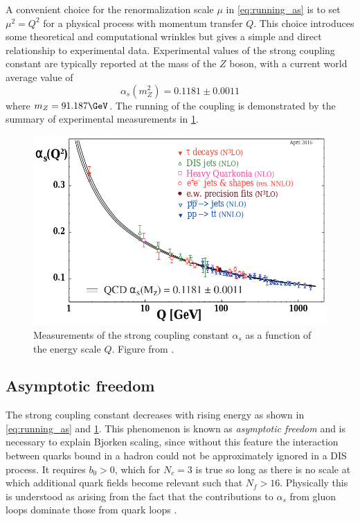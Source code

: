 A convenient choice for the renormalization scale $\mu$ in \cref{eq:running_as} is to set $\mu^2 = Q^2$ for a physical process with momentum transfer $Q$.
This choice introduces some theoretical and computational wrinkles but gives a simple and direct relationship to experimental data.
Experimental values of the strong coupling constant are typically reported at the mass of the $Z$ boson, with a current world average value of
\[
\alpha_s(m_Z^2) = 0.1181 \pm 0.0011
\]
where $m_Z = 91.187 \GeV$.
The running of the coupling is demonstrated by the summary of experimental measurements in \cref{fig:running_coupling}.

\begin{figure}[t]
  \includegraphics{running_as.png}
  \caption{Measurements of the strong coupling constant $\alpha_s$ as a function of the energy scale $Q$. Figure from .}
  \label{fig:running_coupling}
\end{figure}

\subsection{Asymptotic freedom}

The strong coupling constant decreases with rising energy as shown in \cref{eq:running_as} and \cref{fig:running_coupling}.
This phenomenon is known as \emph{asymptotic freedom} and is necessary to explain Bjorken scaling, since without this feature the interaction between quarks bound in a hadron could not be approximately ignored in a \ac{DIS} process.
It requires $b_0 > 0$, which for $N_c = 3$ \qcd is true so long as there is no scale at which additional quark fields become relevant such that $N_f > 16$.
Physically this is understood as arising from the fact that the contributions to $\alpha_s$ from gluon loops dominate those from quark loops \cite{Wilczek:2005az}.

